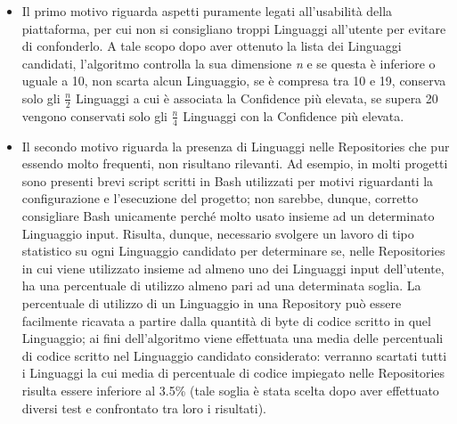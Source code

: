 \begin{itemize}
    \item Il primo motivo riguarda aspetti puramente legati all'usabilità della piattaforma, per cui non si consigliano troppi Linguaggi all'utente per evitare di confonderlo. A tale scopo dopo aver ottenuto la lista dei Linguaggi candidati, l'algoritmo controlla la sua dimensione \emph{n} e se questa è inferiore o uguale a 10, non scarta alcun Linguaggio, se è compresa tra 10 e 19, conserva solo gli \emph{$\frac{n}{2}$} Linguaggi a cui è associata la Confidence più elevata, se supera 20 vengono conservati solo gli \emph{$\frac{n}{4}$} Linguaggi con la Confidence più elevata. 
    \item Il secondo motivo riguarda la presenza di Linguaggi nelle Repositories che pur essendo molto frequenti, non risultano rilevanti. Ad esempio, in molti progetti sono presenti brevi script scritti in Bash utilizzati per motivi riguardanti la configurazione e l'esecuzione del progetto; non sarebbe, dunque, corretto consigliare Bash unicamente perché molto usato insieme ad un determinato Linguaggio input.
    Risulta, dunque, necessario svolgere un lavoro di tipo statistico su ogni Linguaggio candidato per determinare se, nelle Repositories in cui viene utilizzato insieme ad almeno uno dei Linguaggi input dell'utente, ha una percentuale di utilizzo almeno pari ad una determinata soglia. La percentuale di utilizzo di un Linguaggio in una Repository può essere facilmente ricavata a partire dalla quantità di byte di codice scritto in quel Linguaggio; ai fini dell'algoritmo viene effettuata una media delle percentuali di codice scritto nel Linguaggio candidato considerato: verranno scartati tutti i Linguaggi la cui media di percentuale di codice impiegato nelle Repositories risulta essere inferiore al 3.5\% (tale soglia è stata scelta dopo aver effettuato diversi test e confrontato tra loro i risultati).
\end{itemize}
